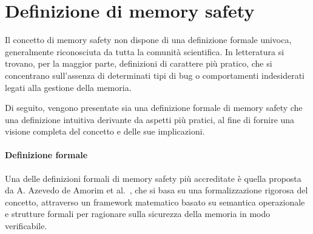 \section{Definizione di memory safety}
\label{sec:memory_safety}

Il concetto di memory safety non dispone di una definizione formale univoca,
generalmente riconosciuta da tutta la comunità scientifica. In letteratura si trovano,
per la maggior parte, definizioni di carattere più pratico, che si concentrano
sull'assenza di determinati tipi di bug o comportamenti indesiderati legati alla
gestione della memoria.

Di seguito, vengono presentate sia una definizione formale di memory safety che una
definizione intuitiva derivante da aspetti più pratici, al fine di fornire una
visione completa del concetto e delle sue implicazioni.

\paragraph{Definizione formale}

Una delle definizioni formali di memory safety più accreditate è quella proposta
da A. Azevedo de Amorim et al.~\cite{meaning_memory_safety}, che si basa su una formalizzazione
rigorosa del concetto, attraverso un framework matematico basato su semantica
operazionale e strutture formali per ragionare sulla sicurezza della memoria in
modo verificabile.

